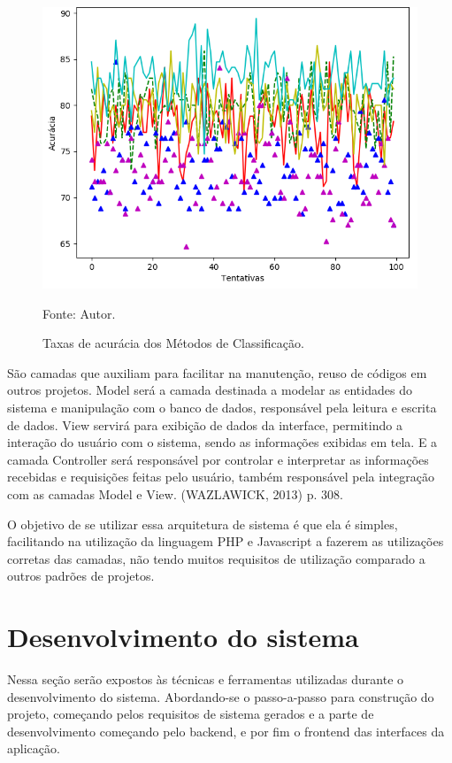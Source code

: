 \documentclass[
	12pt,				%
	openright,			%
	oneside,			%
	a4paper,			%
	english,			%
	french,				%
	spanish,			%
	brazil,				%
	]{abntex2}
\begin{document}
\begin{figure}[ht]
    \centering
    \caption{Taxas de acurácia dos Métodos de Classificação.}
    \includegraphics[width=5.0in]{Images/acc-classification.png}
    \label{fig: grafico-acc}
    
    \centering \small Fonte: Autor.
\end{figure}

São camadas que auxiliam para facilitar na manutenção, reuso de códigos em outros projetos. Model será a camada destinada a modelar as entidades do sistema e manipulação com o banco de dados, responsável pela leitura e escrita de dados. View servirá para exibição de dados da interface, permitindo a interação do usuário com o sistema, sendo as informações exibidas em tela. E a camada Controller será responsável por controlar e interpretar as informações recebidas e requisições feitas pelo usuário, também responsável pela integração com as camadas Model e View. (WAZLAWICK, 2013) p. 308.

O objetivo de se utilizar essa arquitetura de sistema é que ela é simples, facilitando na utilização da linguagem PHP e Javascript a fazerem as utilizações corretas das camadas, não tendo muitos requisitos de utilização comparado a outros padrões de projetos.

\section{Desenvolvimento do sistema}

Nessa seção serão expostos às técnicas e ferramentas utilizadas durante o desenvolvimento do sistema. Abordando-se o passo-a-passo para construção do projeto, começando pelos requisitos de sistema gerados e a parte de desenvolvimento começando pelo backend,  e por fim o frontend das interfaces da aplicação. 
\end{document}
